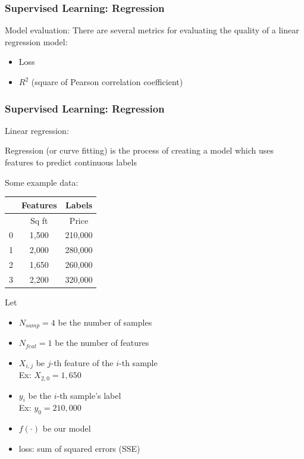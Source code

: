 \documentclass{beamer}
\begin{document}
\begin{frame}
	\frametitle{Supervised Learning: Regression}
	
	\begin{block}{Model evaluation:}
		There are several metrics for evaluating the quality of a linear regression model:
		\begin{itemize}
			\item Loss
			\item $R^2$ (square of Pearson correlation coefficient)
		\end{itemize}
	\end{block}

\end{frame}

\begin{frame}
	\frametitle{Supervised Learning: Regression}
	
	\begin{alertblock}{Linear regression:}
		\footnotesize
		
			Regression (or curve fitting) is the process of creating a model which uses features to predict continuous labels
			
			\vspace{10pt}
			Some example data: \\
			
			\begin{tabular}{|c|c|c|}
				\hline
				& Features & Labels \\
				\hline
				& Sq ft & Price \\
				\hline
				0 & 1,500 & 210,000 \\
				\hline
				1 & 2,000 & 280,000 \\
				\hline
				2 & 1,650 & 260,000 \\
				\hline
				3 & 2,200 & 320,000 \\
				\hline
			\end{tabular}
		\endminipage\hfill
		\endminipage\hfill
			Let
			\begin{itemize}
				\item $N_{samp}=4$ be the number of samples
				\item $N_{feat}=1$ be the number of features
				\item $X_{i,j}$ be $j$-th feature of the $i$-th sample \\
				Ex: $X_{2,0} = 1,650$
				\item $y_i$ be the $i$-th sample's label \\
				Ex: $y_{0} = 210,000$
				\item $f(\cdot)$ be our model
				\item loss: sum of squared errors (SSE)
			\end{itemize}
			

\end{alertblock}
\end{frame}
\end{document}
